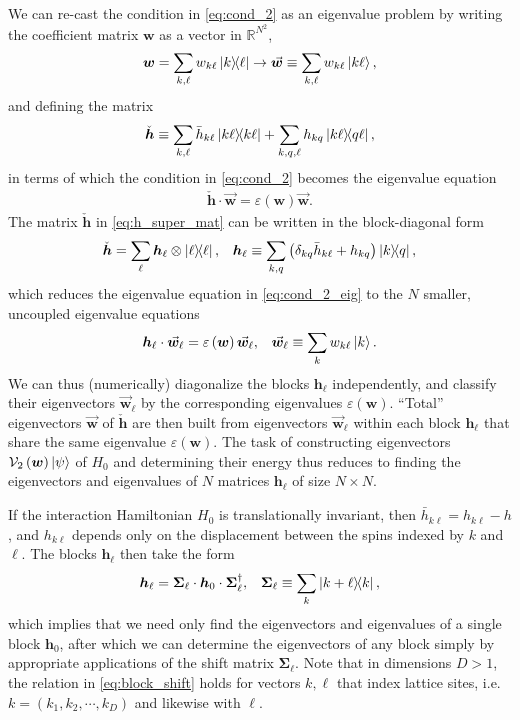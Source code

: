 \documentclass[nofootinbib,notitlepage,11pt]{revtex4-2}
\newcommand{\p}[1]{\left(#1\right)} %
\renewcommand{\c}{\cdot} %
\newcommand{\m}{\bm} %
\renewcommand{\v}{\vec} %
\newcommand{\1}{\mathds{1}}
\newcommand{\e}{\varepsilon}
\newcommand{\V}{\mathcal{V}}
\newcommand{\RR}{\mathbb{R}}
\begin{document}
We can re-cast the condition in \eqref{eq:cond_2} as an eigenvalue
problem by writing the coefficient matrix $\m w$ as a vector in
$\RR^{N^2}$,
\begin{align}
  \m w = \sum_{k,\ell} w_{k\ell} \op{k}{\ell}
  \to \v{\m w} \equiv \sum_{k,\ell} w_{k\ell} \ket{k\ell},
\end{align}
and defining the matrix
\begin{align}
  \check{\m h}
  \equiv \sum_{k,\ell} \bar h_{k\ell} \op{k\ell}
  + \sum_{k,q,\ell} h_{kq} \op{k\ell}{q\ell},
  \label{eq:h_super_mat}
\end{align}
in terms of which the condition in \eqref{eq:cond_2} becomes the
eigenvalue equation
\begin{align}
  \check{\m h} \c \v{\m w} = \e\p{\m w} \v{\m w}.
  \label{eq:cond_2_eig}
\end{align}
The matrix $\check{\m h}$ in \eqref{eq:h_super_mat} can be written in
the block-diagonal form
\begin{align}
  \check{\m h} = \sum_\ell \m h_\ell \otimes \op{\ell},
  &&
  \m h_\ell
  \equiv \sum_{k,q}\p{\delta_{kq} \bar h_{k\ell} + h_{kq}} \op{k}{q},
\end{align}
which reduces the eigenvalue equation in \eqref{eq:cond_2_eig} to the
$N$ smaller, uncoupled eigenvalue equations
\begin{align}
  \m h_\ell \c \v{\m w}_\ell = \e\p{\m w} \v{\m w}_\ell,
  &&
  \v{\m w}_\ell \equiv \sum_k w_{k\ell} \ket{k}.
  \label{eq:cond_2_eig_block}
\end{align}
We can thus (numerically) diagonalize the blocks $\m h_\ell$
independently, and classify their eigenvectors $\v{\m w}_\ell$ by the
corresponding eigenvalues $\e\p{\m w}$.  ``Total'' eigenvectors
$\v{\m w}$ of $\check{\m h}$ are then built from eigenvectors
$\v{\m w}_\ell$ within each block $\m h_\ell$ that share the same
eigenvalue $\e\p{\m w}$.  The task of constructing eigenvectors
$\V_2\p{\m w}\ket\psi$ of $H_0$ and determining their energy thus
reduces to finding the eigenvectors and eigenvalues of $N$ matrices
$\m h_\ell$ of size $N\times N$.

If the interaction Hamiltonian $H_0$ is translationally invariant,
then $\bar h_{k\ell}=h_{k\ell}-h$, and $h_{k\ell}$ depends only on the
displacement between the spins indexed by $k$ and $\ell$.  The blocks
$\m h_\ell$ then take the form
\begin{align}
  \m h_{\ell} = \m\Sigma_\ell \c \m h_0 \c \m\Sigma_\ell^\dag,
  &&
  \m\Sigma_\ell \equiv \sum_k \op{k+\ell}{k},
  \label{eq:block_shift}
\end{align}
which implies that we need only find the eigenvectors and eigenvalues
of a single block $\m h_0$, after which we can determine the
eigenvectors of any block simply by appropriate applications of the
shift matrix $\m\Sigma_\ell$.  Note that in dimensions $D>1$, the
relation in \eqref{eq:block_shift} holds for vectors $k,\ell$ that
index lattice sites, i.e.~$k=\p{k_1,k_2,\cdots,k_D}$ and likewise with
$\ell$.
\end{document}
